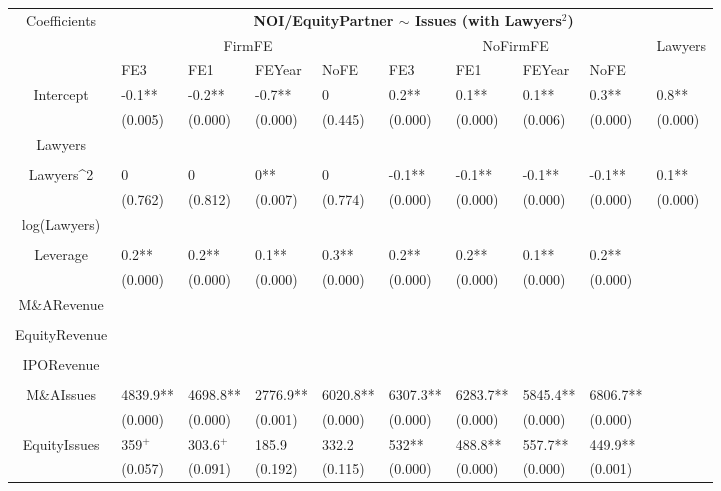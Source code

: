 \documentclass{article}
\begin{document}
\begin{table}[H]
\centering
\begin{tabular}{|clllllllll|}
\hline
\multirow{3}{*}{Coefficients} & \multicolumn{9}{c|}{\textbf{NOI/EquityPartner $\sim$ Issues (with Lawyers$^2$)}} \\
\cline{2-10}
& \multicolumn{4}{c}{FirmFE} & \multicolumn{4}{c}{NoFirmFE} & \multirow{2}{*}{Lawyers} \\
\cline{2-9}
& FE3 & FE1 & FEYear & NoFE & FE3 & FE1 & FEYear & NoFE &  \\
\hline
 
Intercept & -0.1** & -0.2** & -0.7** & 0 & 0.2** & 0.1** & 0.1** & 0.3** & 0.8** \\ 
   & (0.005) & (0.000) & (0.000) & (0.445) & (0.000) & (0.000) & (0.006) & (0.000) & (0.000) \\ 
  Lawyers &  &  &  &  &  &  &  &  &  \\ 
   &  &  &  &  &  &  &  &  &  \\ 
  Lawyers^2 & 0 & 0 & 0** & 0 & -0.1** & -0.1** & -0.1** & -0.1** & 0.1** \\ 
   & (0.762) & (0.812) & (0.007) & (0.774) & (0.000) & (0.000) & (0.000) & (0.000) & (0.000) \\ 
  log(Lawyers) &  &  &  &  &  &  &  &  &  \\ 
   &  &  &  &  &  &  &  &  &  \\ 
  Leverage & 0.2** & 0.2** & 0.1** & 0.3** & 0.2** & 0.2** & 0.1** & 0.2** &  \\ 
   & (0.000) & (0.000) & (0.000) & (0.000) & (0.000) & (0.000) & (0.000) & (0.000) &  \\ 
  M\&ARevenue &  &  &  &  &  &  &  &  &  \\ 
   &  &  &  &  &  &  &  &  &  \\ 
  EquityRevenue &  &  &  &  &  &  &  &  &  \\ 
   &  &  &  &  &  &  &  &  &  \\ 
  IPORevenue &  &  &  &  &  &  &  &  &  \\ 
   &  &  &  &  &  &  &  &  &  \\ 
  M\&AIssues & 4839.9** & 4698.8** & 2776.9** & 6020.8** & 6307.3** & 6283.7** & 5845.4** & 6806.7** &  \\ 
   & (0.000) & (0.000) & (0.001) & (0.000) & (0.000) & (0.000) & (0.000) & (0.000) &  \\ 
  EquityIssues & 359$^{+}$ & 303.6$^{+}$ & 185.9 & 332.2 & 532** & 488.8** & 557.7** & 449.9** &  \\ 
   & (0.057) & (0.091) & (0.192) & (0.115) & (0.000) & (0.000) & (0.000) & (0.001) &  \\ 

\end{tabular}
\end{table}
\end{document}
